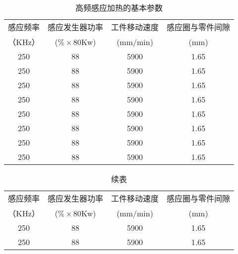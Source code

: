 \begin{table}[!htbp]
    \centering
    \caption{高频感应加热的基本参数}
    \begin{tabular}{|c| c|c|c|}
    \hline
    感应频率 &感应发生器功率 & 工件移动速度  &感应圈与零件间隙\\
    （KHz）&($\% \times$80Kw) &(mm/min)  &(mm)\\
    \hline
    250 &88 &5900 &1.65\\
    \hline
    250 &88 &5900 &1.65\\
    \hline
    250 &88 &5900 &1.65\\
    \hline
    250 &88 &5900 &1.65\\
    \hline
    250 &88 &5900 &1.65\\
    \hline
    250 &88 &5900 &1.65\\
    \hline
    250 &88 &5900 &1.65\\
    \hline
    250 &88 &5900 &1.65\\
    \hline
    \end{tabular}
\end{table}


\begin{table}
    \centering
    \captionsetup{singlelinecheck=off}
    \caption*{续表} %
    \begin{tabular}{|c| c|c|c|}
    \hline
    感应频率 &感应发生器功率 & 工件移动速度  &感应圈与零件间隙\\
    （KHz）&($\% \times$80Kw) &(mm/min)  &(mm)\\
    \hline
    250 &88 &5900 &1.65\\
    \hline
    250 &88 &5900 &1.65\\
    \hline
    \end{tabular}
\end{table}

